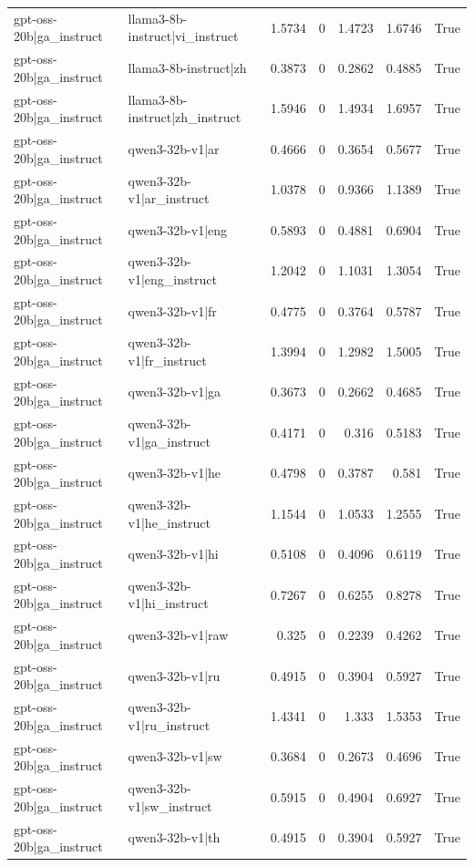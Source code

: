 \begin{table}
\begin{tabular}{l l r r r r l}
gpt-oss-20b|ga_instruct & llama3-8b-instruct|vi_instruct & 1.5734 & 0 & 1.4723 & 1.6746 & True \\
gpt-oss-20b|ga_instruct & llama3-8b-instruct|zh & 0.3873 & 0 & 0.2862 & 0.4885 & True \\
gpt-oss-20b|ga_instruct & llama3-8b-instruct|zh_instruct & 1.5946 & 0 & 1.4934 & 1.6957 & True \\
gpt-oss-20b|ga_instruct & qwen3-32b-v1|ar & 0.4666 & 0 & 0.3654 & 0.5677 & True \\
gpt-oss-20b|ga_instruct & qwen3-32b-v1|ar_instruct & 1.0378 & 0 & 0.9366 & 1.1389 & True \\
gpt-oss-20b|ga_instruct & qwen3-32b-v1|eng & 0.5893 & 0 & 0.4881 & 0.6904 & True \\
gpt-oss-20b|ga_instruct & qwen3-32b-v1|eng_instruct & 1.2042 & 0 & 1.1031 & 1.3054 & True \\
gpt-oss-20b|ga_instruct & qwen3-32b-v1|fr & 0.4775 & 0 & 0.3764 & 0.5787 & True \\
gpt-oss-20b|ga_instruct & qwen3-32b-v1|fr_instruct & 1.3994 & 0 & 1.2982 & 1.5005 & True \\
gpt-oss-20b|ga_instruct & qwen3-32b-v1|ga & 0.3673 & 0 & 0.2662 & 0.4685 & True \\
gpt-oss-20b|ga_instruct & qwen3-32b-v1|ga_instruct & 0.4171 & 0 & 0.316 & 0.5183 & True \\
gpt-oss-20b|ga_instruct & qwen3-32b-v1|he & 0.4798 & 0 & 0.3787 & 0.581 & True \\
gpt-oss-20b|ga_instruct & qwen3-32b-v1|he_instruct & 1.1544 & 0 & 1.0533 & 1.2555 & True \\
gpt-oss-20b|ga_instruct & qwen3-32b-v1|hi & 0.5108 & 0 & 0.4096 & 0.6119 & True \\
gpt-oss-20b|ga_instruct & qwen3-32b-v1|hi_instruct & 0.7267 & 0 & 0.6255 & 0.8278 & True \\
gpt-oss-20b|ga_instruct & qwen3-32b-v1|raw & 0.325 & 0 & 0.2239 & 0.4262 & True \\
gpt-oss-20b|ga_instruct & qwen3-32b-v1|ru & 0.4915 & 0 & 0.3904 & 0.5927 & True \\
gpt-oss-20b|ga_instruct & qwen3-32b-v1|ru_instruct & 1.4341 & 0 & 1.333 & 1.5353 & True \\
gpt-oss-20b|ga_instruct & qwen3-32b-v1|sw & 0.3684 & 0 & 0.2673 & 0.4696 & True \\
gpt-oss-20b|ga_instruct & qwen3-32b-v1|sw_instruct & 0.5915 & 0 & 0.4904 & 0.6927 & True \\
gpt-oss-20b|ga_instruct & qwen3-32b-v1|th & 0.4915 & 0 & 0.3904 & 0.5927 & True \\

\end{tabular}
\end{table}
